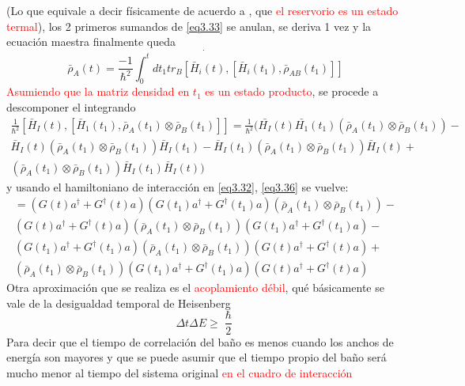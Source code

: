 \documentclass{book}
\begin{document}
(Lo que equivale a decir físicamente de acuerdo a \textcolor{red}{\cite{Orszag}}, que \textcolor{Red}{el reservorio es un estado termal}), los 2 primeros sumandos de \textcolor{blue}{\ref{eq3.33}} se anulan, se deriva 1 vez y la ecuación maestra finalmente queda
\begin{equation}\label{eq3.35}\dot{\bar{\rho}_A(t)=\frac{-1}{\hslash^2}\int_0^tdt_1 tr_B[\bar{H}_i(t),[\bar{H}_i(t_1),\bar{\rho}_{AB}(t_1)]]}\end{equation}
\textcolor{Red}{Asumiendo que la matriz densidad en $t_1$ es un estado producto}, se procede a descomponer el integrando 
\begin{equation}\label{eq3.36}\begin{aligned}\frac{1}{\hslash^2}[\bar{H}_I(t),[\bar{H}_1(t_1),\bar{\rho}_A(t_1)\otimes\bar{\rho}_B(t_1)]]=\frac{1}{\hslash^2}(\bar{H_I}(t)\bar{H_1}(t_1)(\bar{\rho}_A(t_1)\otimes\bar{\rho}_B(t_1))-\\  \bar{H}_I(t)(\bar{\rho}_A(t_1)\otimes\bar{\rho}_B(t_1))\bar{H}_I(t_1) -\bar{H}_I(t_1)(\bar{\rho}_A(t_1)\otimes\bar{\rho}_B(t_1))\bar{H}_I(t)+ \\ (\bar{\rho}_A(t_1)\otimes\bar{\rho}_B(t_1))\bar{H}_I(t_1)\bar{H}_I(t))\end{aligned}\end{equation}
 y usando el hamiltoniano de interacción en \textcolor{blue}{\ref{eq3.32}}, \textcolor{blue}{\ref{eq3.36}} se vuelve:
 \begin{equation}\begin{aligned} \label{eq3.37} { =(G(t)a^\dag+G^\dag(t)a)(G(t_1)a^\dag+G^\dag(t_1)a)(\bar{\rho}_A(t_1)\otimes\bar{\rho}_B(t_1))-} \\ {(G(t)a^\dag+G^\dag(t)a)(\bar{\rho}_A(t_1)\otimes\bar{\rho}_B(t_1))(G(t_1)a^\dag+G^\dag(t_1)a)-} \\ {(G(t_1)a^\dag+G^\dag(t_1)a)(\bar{\rho}_A(t_1)\otimes\bar{\rho}_B(t_1))(G(t)a^\dag+G^\dag(t)a)+} \\ {(\bar{\rho}_A(t_1)\otimes\bar{\rho}_B(t_1))(G(t_1)a^\dag+G^\dag(t_1)a)(G(t)a^\dag+G^\dag(t)a)} \end{aligned}\end{equation}
 Otra aproximación que se realiza es el \textcolor{Red}{acoplamiento débil}, qué básicamente se vale de la desigualdad temporal de Heisenberg
 \begin{equation}\label{eq3.38} {\Delta t \Delta E \geq \frac{\hslash}{2}}\end{equation}
 Para decir que el tiempo de correlación del baño es menos cuando los anchos de energía son mayores y que se puede asumir que el tiempo propio del baño será mucho menor al tiempo del sistema original \textcolor{Red}{en el cuadro de interacción}
\end{document}

